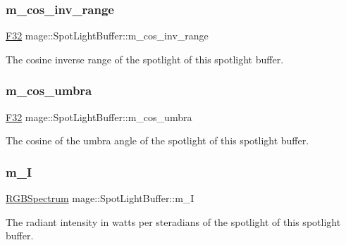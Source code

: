 \subsubsection{\texorpdfstring{m\+\_\+cos\+\_\+inv\+\_\+range}{m\_cos\_inv\_range}}
{\footnotesize\ttfamily \hyperlink{namespacemage_aa97e833b45f06d60a0a9c4fc22ae02c0}{F32} mage\+::\+Spot\+Light\+Buffer\+::m\+\_\+cos\+\_\+inv\+\_\+range}

The cosine inverse range of the spotlight of this spotlight buffer. \hypertarget{structmage_1_1_spot_light_buffer_a7f12f0a2f82b99253e4ae9aff259b3ed}{}\label{structmage_1_1_spot_light_buffer_a7f12f0a2f82b99253e4ae9aff259b3ed} 
\subsubsection{\texorpdfstring{m\+\_\+cos\+\_\+umbra}{m\_cos\_umbra}}
{\footnotesize\ttfamily \hyperlink{namespacemage_aa97e833b45f06d60a0a9c4fc22ae02c0}{F32} mage\+::\+Spot\+Light\+Buffer\+::m\+\_\+cos\+\_\+umbra}

The cosine of the umbra angle of the spotlight of this spotlight buffer. \hypertarget{structmage_1_1_spot_light_buffer_a778a729e75ff4074fc5aede42f551ab2}{}\label{structmage_1_1_spot_light_buffer_a778a729e75ff4074fc5aede42f551ab2} 
\subsubsection{\texorpdfstring{m\+\_\+I}{m\_I}}
{\footnotesize\ttfamily \hyperlink{structmage_1_1_r_g_b_spectrum}{R\+G\+B\+Spectrum} mage\+::\+Spot\+Light\+Buffer\+::m\+\_\+I}

The radiant intensity in watts per steradians of the spotlight of this spotlight buffer. \hypertarget{structmage_1_1_spot_light_buffer_ab4039d0e1761aba882126c8fd34f309c}{}\label{structmage_1_1_spot_light_buffer_ab4039d0e1761aba882126c8fd34f309c} 

